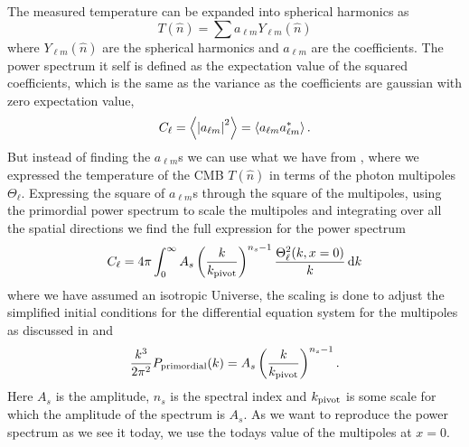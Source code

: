 \documentclass[10pt,a4paper]{article}
\begin{document}
The measured temperature can be expanded into spherical harmonics as
\begin{equation}
  T(\hat{n}) = \sum a_{\ell m} Y_{\ell m}(\hat{n})
  \label{eq: T spherical harmonics}
\end{equation}
where $Y_{\ell m}(\hat{n})$ are the spherical harmonics and $a_{\ell m}$ are the coefficients. The power spectrum it self is defined as the expectation value of the squared coefficients, which is the same as the variance as the coefficients are gaussian with zero expectation value,
\begin{equation*}
  C_\ell = \left<\abs{a_{\ell m}}^2\right> = \left<a_{\ell m}a_{\ell m}^\ast\right>.
\end{equation*}
But instead of finding the $a_{\ell m}$s we can use what we have from \cite{milestone3}, where we expressed the temperature of the CMB $T(\hat{n})$ in terms of the photon multipoles $\Theta_\ell$. Expressing the square of $a_{\ell m}$s through the square of the multipoles, using the primordial power spectrum to scale the multipoles and integrating over all the spatial directions we find the full expression for the power spectrum
\begin{equation}
  C_\ell = 4\pi \int_0^\infty A_s \left(\frac{k}{k_{\rm{pivot}}}\right)^{n_s-1}\frac{\Theta_\ell^2(k,x=0)}{k}\dd{k}
  \label{eq: C_ell} 
\end{equation}
where we have assumed an isotropic Universe, the scaling is done to adjust the simplified initial conditions for the differential equation system for the multipoles as discussed in \cite{milestone3} and
\begin{equation}
  \frac{k^3}{2\pi^2}P_{\rm{primordial}}(k) = A_s\left(\frac{k}{k_{\rm{pivot}}}\right)^{n_s-1}.
  \label{eq: Priomrodial power spectrum equation}
\end{equation}
Here $A_s$ is the amplitude, $n_s$ is the spectral index and $k_{\rm{pivot}}$ is some scale for which the amplitude of the spectrum is $A_s$. As we want to reproduce the power spectrum as we see it today, we use the todays value of the multipoles at $x=0$.
\end{document}
